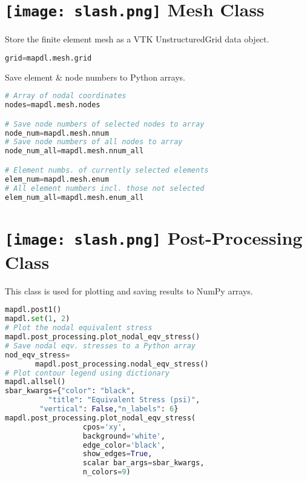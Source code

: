 \documentclass[9pt,landscape]{article}
\begin{document}
\begin{multicols}{3}
\section{\texttt{[image: slash.png]} Mesh Class}
Store the finite element mesh as a VTK UnstructuredGrid data object.
\begin{lstlisting}[language=Python]
grid=mapdl.mesh.grid
\end{lstlisting} 

Save element \& node numbers to Python arrays.
\begin{lstlisting}[language=Python]
# Array of nodal coordinates
nodes=mapdl.mesh.nodes

# Save node numbers of selected nodes to array
node_num=mapdl.mesh.nnum
# Save node numbers of all nodes to array
node_num_all=mapdl.mesh.nnum_all

# Element numbs. of currently selected elements
elem_num=mapdl.mesh.enum
# All element numbers incl. those not selected
elem_num_all=mapdl.mesh.enum_all
\end{lstlisting} 
\vfill

\columnbreak

\section{\texttt{[image: slash.png]} Post-Processing Class}
This class is used for plotting and saving results to NumPy arrays.
\begin{lstlisting}[language=Python]
mapdl.post1()
mapdl.set(1, 2)
# Plot the nodal equivalent stress
mapdl.post_processing.plot_nodal_eqv_stress()
# Save nodal eqv. stresses to a Python array
nod_eqv_stress=
       mapdl.post_processing.nodal_eqv_stress()
# Plot contour legend using dictionary
mapdl.allsel()
sbar_kwargs={"color": "black",
          "title": "Equivalent Stress (psi)",
        "vertical": False,"n_labels": 6}
mapdl.post_processing.plot_nodal_eqv_stress(
                  cpos='xy',
                  background='white',
                  edge_color='black',
                  show_edges=True,
                  scalar bar_args=sbar_kwargs,
                  n_colors=9)
\end{lstlisting} 
\vfill

\end{multicols}
\end{document}
